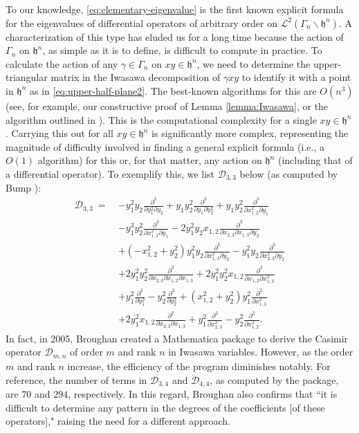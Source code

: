 \documentclass[12pt, reqno, oneside]{amsart}
\numberwithin{equation}{section}
\begin{document}
To our knowledge, \eqref{eq:elementary-eigenvalue} is the first known explicit formula for the eigenvalues of differential operators of arbitrary order on $\mathcal{L}^2(\Gamma_n \backslash \mathfrak{h}^n)$. A characterization of this type has eluded us for a long time because the action of $\Gamma_n$ on $\mathfrak{h}^n$, as simple as it is to define, is difficult to compute in practice. To calculate the action of any $\gamma \in \Gamma_n$ on $xy \in \mathfrak{h}^n$, we need to determine the upper-triangular matrix in the Iwasawa decomposition of $\gamma xy$ to identify it with a point in $\mathfrak{h}^n$ as in \eqref{eq:upper-half-plane2}. The best-known algorithms for this are $O(n^3)$ (see, for example, our constructive proof of Lemma \ref{lemma:Iwasawa}, or the algorithm outlined in \cite[Proposition 1.2.6]{Gol06}). This is the computational complexity for a single $xy \in \mathfrak{h}^n$. Carrying this out for all $xy \in \mathfrak{h}^n$ is significantly more complex, representing the magnitude of difficulty involved in finding a general explicit formula (i.e., a $O(1)$ algorithm) for this or, for that matter, any action on $\mathfrak{h}^n$ (including that of a differential operator). To exemplify this, we list $\mathcal{D}_{3,3}$ below (as computed by Bump \cite{Bum84}): 
\begin{align}\label{eq:Casimir-order-3}
\nonumber
\mathcal{D}_{3,3} \ = \ &-y_1^2y_2\frac{\partial^3}{\partial y_1^2 \partial y_2} + y_1y_2^2\frac{\partial^3}{\partial y_1 \partial y_2^2} + y_1y_2^2\frac{\partial^3}{\partial x_{1,2}^2 \partial y_1} \\
\nonumber
&- y_1^3y_2^2\frac{\partial^3}{\partial x_{1,3}^2 \partial y_1}  -2y_1^2y_2x_{1,2}\frac{\partial^3}{\partial x_{2,3} \partial x_{1,3} \partial y_2} \\
\nonumber
&+ (-x_{1,2}^2 + y_2^2)y_1^2y_2\frac{\partial^3}{\partial x_{1,3}^2 \partial y_2} -y_1^2y_2\frac{\partial^3}{\partial x_{2,3}^2 \partial y_2} \\
\nonumber
&+ 2y_1^2y_2^2\frac{\partial^3}{\partial x_{2,3} \partial x_{1,2}\partial x_{1,3}} + 2y_1^2y_2^2x_{1,2}\frac{\partial^3}{\partial x_{1,2} \partial x_{1,3}^2} \\
\nonumber
&+y_1^2\frac{\partial^2}{\partial y_1^2} -y_2^2\frac{\partial^2}{\partial y_2^2} + (x_{1,2}^2+y_2^2)y_1^2\frac{\partial^2}{\partial x_{1,3}^2} \\
& + 2y_1^2x_{1,2}\frac{\partial^2}{\partial x_{2,3}\partial x_{1,3}} + y_1^2 \frac{\partial^2}{\partial x_{2,3}^2} - y_2^2\frac{\partial^2}{\partial x_{1,2}^2}.
\end{align}
In fact, in 2005, Broughan \cite[Appendix:\@ The GL(n)pack Manual]{Gol06} created a Mathematica package to derive the Casimir operator $\mathcal{D}_{m,n}$ of order $m$ and rank $n$ in Iwasawa variables. However, as the order $m$ and rank $n$ increase, the efficiency of the program diminishes notably. For reference, the number of terms in $\mathcal{D}_{3,4}$ and $\mathcal{D}_{4,4}$, as computed by the package, are $70$ and $294$, respectively. In this regard, Broughan \cite{Bro07} also confirms that ``it is difficult to determine any pattern in the degrees of the coefficients [of these operators]," raising the need for a different approach. 
\end{document}
